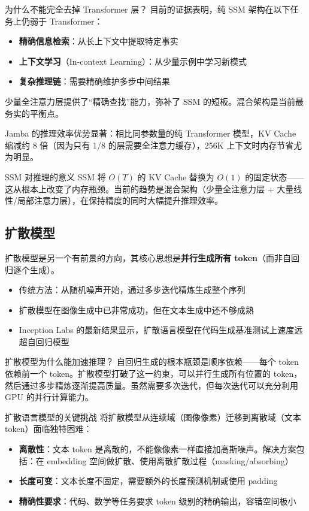 \begin{warningbox}{为什么不能完全去掉 Transformer 层？}
目前的证据表明，纯 SSM 架构在以下任务上仍弱于 Transformer：
\begin{itemize}
    \item \textbf{精确信息检索}：从长上下文中提取特定事实
    \item \textbf{上下文学习}（In-context Learning）：从少量示例中学习新模式
    \item \textbf{复杂推理链}：需要精确维护多步中间结果
\end{itemize}
少量全注意力层提供了``精确查找''能力，弥补了 SSM 的短板。混合架构是当前最务实的平衡点。
\end{warningbox}

Jamba 的推理效率优势显著：相比同参数量的纯 Transformer 模型，KV Cache 缩减约 8 倍（因为只有 1/8 的层需要全注意力缓存），256K 上下文时内存节省尤为明显。

\begin{importantbox}{SSM 对推理的意义}
SSM 将 $O(T)$ 的 KV Cache 替换为 $O(1)$ 的固定状态——这从根本上改变了内存瓶颈。当前的趋势是混合架构（少量全注意力层 + 大量线性/局部注意力层），在保持精度的同时大幅提升推理效率。
\end{importantbox}

\subsection{扩散模型}

扩散模型是另一个有前景的方向，其核心思想是\textbf{并行生成所有 token}（而非自回归逐个生成）。

\begin{itemize}
    \item 传统方法：从随机噪声开始，通过多步迭代精炼生成整个序列
    \item 扩散模型在图像生成中已非常成功，但在文本生成中还不够成熟
    \item Inception Labs 的最新结果显示，扩散语言模型在代码生成基准测试上速度远超自回归模型
\end{itemize}

\begin{knowledgebox}{扩散模型为什么能加速推理？}
自回归生成的根本瓶颈是顺序依赖——每个 token 依赖前一个 token。扩散模型打破了这一约束，可以并行生成所有位置的 token，然后通过多步精炼逐渐提高质量。虽然需要多次迭代，但每次迭代可以充分利用 GPU 的并行计算能力。
\end{knowledgebox}

\begin{importantbox}{扩散语言模型的关键挑战}
将扩散模型从连续域（图像像素）迁移到离散域（文本 token）面临独特困难：
\begin{itemize}
    \item \textbf{离散性}：文本 token 是离散的，不能像像素一样直接加高斯噪声。解决方案包括：在 embedding 空间做扩散、使用离散扩散过程（masking/absorbing）
    \item \textbf{长度可变}：文本长度不固定，需要额外的长度预测机制或使用 padding
    \item \textbf{精确性要求}：代码、数学等任务要求 token 级别的精确输出，容错空间极小
\end{itemize}
\end{importantbox}

